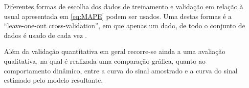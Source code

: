 Diferentes formas de escolha dos dados de treinamento e validação em relação à usual apresentada em \eqref{eq:MAPE} podem ser usados.
Uma destas formas é a “leave-one-out cross-validation”, em que apenas um dado, de todo o conjunto de dados é usado de cada vez \citep{allen1974}.

Além da validação quantitativa em geral recorre-se ainda a uma avaliação qualitativa, na qual é realizada uma comparação gráfica, quanto ao comportamento dinâmico, entre a curva do sinal amostrado e a curva do sinal estimado pelo modelo resultante.






